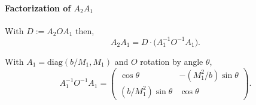 \documentclass[a4paper,11pt]{article}
\theoremstyle{definition}
\begin{document}

\paragraph{Factorization of $A_2 A_1$}


With $D := A_2 O A_1$ then,
\[
A_2 A_1 = D \cdot \bigl(A_1^{-1} O^{-1} A_1\bigr).
\]



With $A_1 = \mathrm{diag}(b/M_1, M_1)$ and $O$ rotation by angle $\theta$,
\[
A_1^{-1} O^{-1} A_1 = \begin{pmatrix} \cos\theta & -(M_1^2/b)\sin\theta \\[4pt] (b/M_1^2)\sin\theta & \cos\theta \end{pmatrix}.
\]
\end{document}

